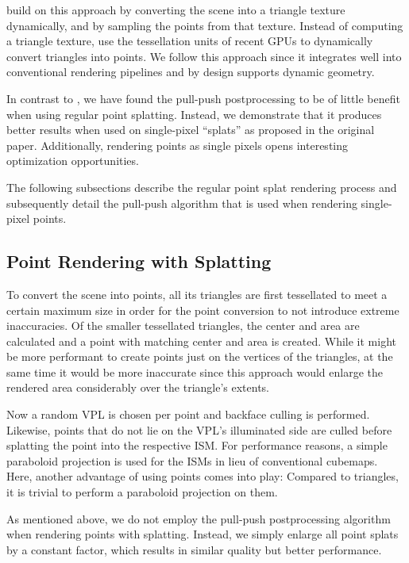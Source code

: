 \citet{ritschel2011ismsViewAdaptive} build on this approach by converting the scene into a triangle texture dynamically, and by sampling the points from that texture. Instead of computing a triangle texture, \citet{barak2013temporally} use the tessellation units of recent GPUs to dynamically convert triangles into points.
We follow this approach since it integrates well into conventional rendering pipelines and by design supports dynamic geometry.

In contrast to \citet{ritschel2008ism}, we have found the pull-push postprocessing to be of little benefit when using regular point splatting. Instead, we demonstrate that it produces better results when used on single-pixel ``splats'' as proposed in the original paper. Additionally, rendering points as single pixels opens interesting optimization opportunities.

The following subsections describe the regular point splat rendering process and subsequently detail the pull-push algorithm that is used when rendering single-pixel points.


\subsection{Point Rendering with Splatting}

To convert the scene into points, all its triangles are first tessellated to meet a certain maximum size in order for the point conversion to not introduce extreme inaccuracies. Of the smaller tessellated triangles, the center and area are calculated and a point with matching center and area is created. While it might be more performant to create points just on the vertices of the triangles, at the same time it would be more inaccurate since this approach would enlarge the rendered area considerably over the triangle's extents.

Now a random VPL is chosen per point and backface culling is performed. Likewise, points that do not lie on the VPL's illuminated side are culled before splatting the point into the respective ISM. For performance reasons, a simple paraboloid projection is used for the ISMs in lieu of conventional cubemaps. Here, another advantage of using points comes into play: Compared to triangles, it is trivial to perform a paraboloid projection on them.

As mentioned above, we do not employ the pull-push postprocessing algorithm when rendering points with splatting. Instead, we simply enlarge all point splats by a constant factor, which results in similar quality but better performance.



